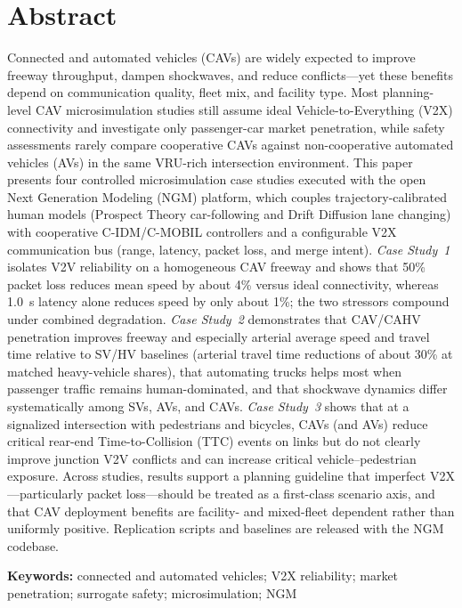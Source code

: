 \documentclass[numbered]{trbunofficial}
\begin{document}
\section*{Abstract}
Connected and automated vehicles (CAVs) are widely expected to improve freeway throughput,
dampen shockwaves, and reduce conflicts---yet these benefits depend on communication quality,
fleet mix, and facility type. Most planning-level CAV microsimulation studies still assume
ideal Vehicle-to-Everything (V2X) connectivity and investigate only passenger-car market
penetration, while safety assessments rarely compare cooperative CAVs against non-cooperative
automated vehicles (AVs) in the same VRU-rich intersection environment. This paper presents
four controlled microsimulation case studies executed with the open Next Generation Modeling
(NGM) platform, which couples trajectory-calibrated human models
(Prospect Theory car-following and Drift Diffusion lane changing) with cooperative C-IDM/C-MOBIL
controllers and a configurable V2X communication bus (range, latency, packet loss, and merge
intent). \emph{Case Study~1} isolates V2V reliability on a homogeneous CAV freeway and shows
that 50\% packet loss reduces mean speed by about 4\% versus ideal connectivity, whereas
1.0~s latency alone reduces speed by only about 1\%; the two stressors compound under combined
degradation. \emph{Case Study~2} demonstrates that CAV/CAHV penetration improves freeway and
especially arterial average speed and travel time relative to SV/HV baselines (arterial travel
time reductions of about 30\% at matched heavy-vehicle shares), that automating trucks helps
most when passenger traffic remains human-dominated, and that shockwave dynamics differ
systematically among SVs, AVs, and CAVs. \emph{Case Study~3} shows that at a signalized
intersection with pedestrians and bicycles, CAVs (and AVs) reduce critical rear-end
Time-to-Collision (TTC) events on links but do not clearly improve junction V2V conflicts and
can increase critical vehicle--pedestrian exposure. Across studies, results support a
planning guideline that imperfect V2X---particularly packet loss---should be treated as a
first-class scenario axis, and that CAV deployment benefits are facility- and mixed-fleet
dependent rather than uniformly positive. Replication scripts and baselines are released with
the NGM codebase.

\noindent\textbf{Keywords:} connected and automated vehicles; V2X reliability; market penetration;
surrogate safety; microsimulation; NGM
\end{document}
